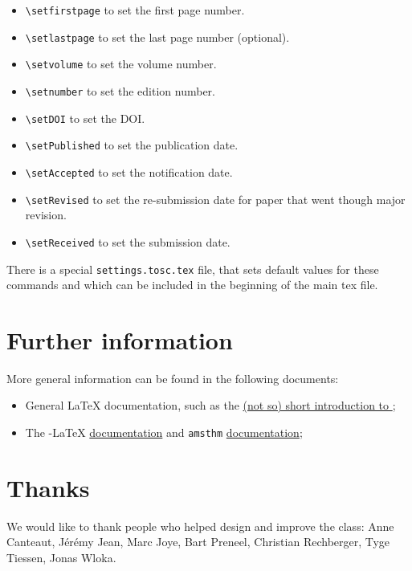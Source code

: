 \documentclass{iacrcc}
\begin{document}
\begin{itemize}
\item \texttt{\textbackslash{}setfirstpage} to set the first page number.
\item \texttt{\textbackslash{}setlastpage} to set the last page number (optional).
\item \texttt{\textbackslash{}setvolume} to set the volume number.
\item \texttt{\textbackslash{}setnumber} to set the edition number.
\item \texttt{\textbackslash{}setDOI} to set the DOI\@.
\item \texttt{\textbackslash{}setPublished} to set the publication date.
\item \texttt{\textbackslash{}setAccepted} to set the notification date.
\item \texttt{\textbackslash{}setRevised} to set the re-submission date for paper that went though major revision.
\item \texttt{\textbackslash{}setReceived} to set the submission date.
\end{itemize}

There is a special \texttt{settings.tosc.tex} file, that sets default values for these commands
and which can be included in the beginning of the main tex file.

\section{Further information}

More general information can be found in the following documents:
\begin{itemize}
\item General \LaTeX{} documentation, such as the
  \href{http://mirrors.ctan.org/info/lshort/english/lshort.pdf}{(not
    so) short introduction to \LaTeXe};
\item The \AmS-\LaTeX{}
  \href{http://mirrors.ctan.org/macros/latex/required/amslatex/math/amsldoc.pdf}{documentation}
  and \texttt{amsthm} \href{ftp://ftp.ams.org/pub/tex/doc/amscls/amsthdoc.pdf}{documentation};
\end{itemize}

\section*{Thanks}
We would like to thank people who helped design and improve the class:
Anne Canteaut,
Jérémy Jean,
Marc Joye,
Bart Preneel,
Christian Rechberger,
Tyge Tiessen,
Jonas Wloka.

\renewcommand{\refname}{Sample References}

\end{document}
